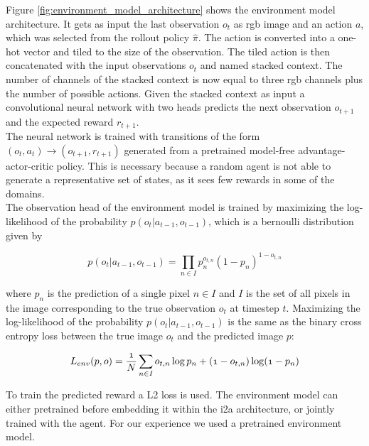 Figure \ref{fig:environment_model_architecture} shows the environment model architecture.
It gets as input the last observation $o_t$ as rgb image and an action $a$, which was selected from the rollout policy $\hat{\pi}$. The action is converted into a one-hot vector and tiled to the size of the observation.
The tiled action is then concatenated with the input observations $o_t$ and named stacked context.
The number of channels of the stacked context is now equal to three rgb channels plus the number of possible actions.
Given the stacked context as input a convolutional neural network with two heads predicts the next observation $o_{t+1}$ and the expected reward $r_{t+1}$.\\

The neural network is trained with transitions of the form $(o_t, a_t) \rightarrow (o_{t+1}, r_{t+1})$ generated from a pretrained model-free advantage-actor-critic policy. This is necessary because a random agent is not able to generate a representative set of states, as it sees few rewards in some of the domains.\\

 
The observation head of the environment model is trained by maximizing the log-likelihood of the probability $p(o_t | a_{t-1}, o_{t-1})$, which is a bernoulli distribution given by

\begin{equation} 
   p(o_t | a_{t-1}, o_{t-1}) = \prod_{n \in I} p_n^{o_{t,n}} (1-p_n)^{1-o_{t,n}} 
\end{equation}

where $p_n$ is the prediction of a single pixel $n\in I$ and $I$ is the set of all pixels in the image corresponding to the true observation $o_t$ at timestep $t$.
Maximizing the log-likelihood of the probability $p(o_t | a_{t-1}, o_{t-1})$ is the same as the binary cross entropy loss between the true image $o_t$ and the predicted image $p$:


\begin{equation} 
  \mathnormal{ 
  L_{env}(p, o) = \frac{1}{N} \sum_{n \in I} o_{t,n} \log p_n + (1-o_{t,n}) \log(1- p_n) 
  } 
\end{equation}

To train the predicted reward a L2 loss is used.
The environment model can either pretrained before embedding it within the i2a architecture, or jointly trained with the agent. For our experience we used a pretrained environment model.\\

